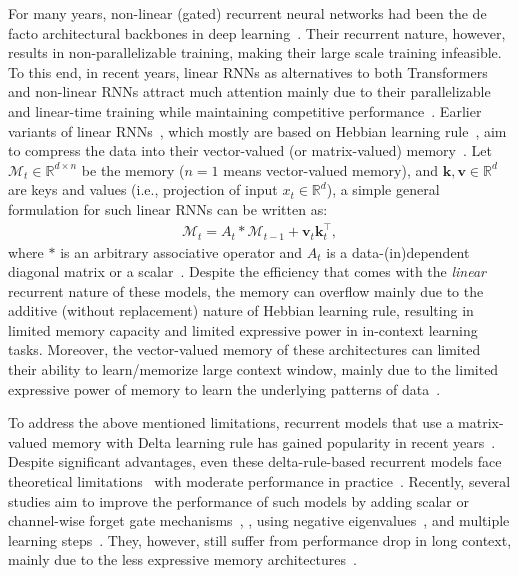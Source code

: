 \documentclass{article}
\newcommand{\citep}{\parencite}
\newcommand{\vk}[0]{\mathbf{k}}
\newcommand{\vvv}[0]{\mathbf{v}}
\newcommand{\M}[0]{\mathcal{M}}
\theoremstyle{plain}
\theoremstyle{definition}
\theoremstyle{remark}
\newcommand{\head}[1]{\vspace{1.7mm}\noindent{{\textcolor{c2}{\bf #1.}}}}
\begin{document}
\head{(Linear) Recurrent Models}
For many years, non-linear (gated) recurrent neural networks had been the de facto architectural backbones in deep learning~\citep{greff2016lstm}. Their recurrent nature, however, results in non-parallelizable training, making their large scale training infeasible. To this end, in recent years, linear RNNs as alternatives to both Transformers and non-linear RNNs attract much attention mainly due to their parallelizable and linear-time training while maintaining competitive performance~\citep{yang2024parallelizing, sun2023retentive, rwkv-repo}. Earlier variants of linear RNNs~\citep{yang2024gatedattn, sun2023retentive, de2024griffin}, which mostly are based on Hebbian learning rule~\citep{hebb2005organization}, aim to compress the data into their vector-valued (or matrix-valued) memory~\citep{katharopoulos2020transformers, sun2023retentive, yang2024gatedattn, de2024griffin, liu2024longhorn}. Let $\M_t \in \mathbb{R}^{d \times n}$ be the memory ($n=1$ means vector-valued memory), and $\vk, \vvv \in \mathbb{R}^{d}$ are keys and values (i.e., projection of input $x_t \in \mathbb{R}^{d}$), a simple general formulation for such linear RNNs can be written as:
\begin{align}
    \M_t = A_{t} \ast \M_{t-1} + \vvv_t \vk_t^{\top}, 
\end{align}
where $\ast$ is an arbitrary associative operator and $A_t$ is a data-(in)dependent diagonal matrix or a scalar~\citep{yang2024parallelizing}. Despite the efficiency that comes with the \emph{linear} recurrent nature of these models, the memory can overflow mainly due to the additive (without replacement) nature of Hebbian learning rule, resulting in limited memory capacity and limited expressive power in in-context learning tasks. Moreover, the vector-valued memory of these architectures can limited their ability to learn/memorize large context window, mainly due to the limited expressive power of memory to learn the underlying patterns of data~\citep{behrouz2024titans, sun2024learning}.
 
To address the above mentioned limitations, recurrent models that use a matrix-valued memory with Delta learning rule has gained popularity in recent years~\citep{neil2017delta,schlag2021linear, yang2024parallelizing}. Despite significant advantages, even these delta-rule-based recurrent models face theoretical limitations~\citep{irie2023practical} with moderate performance in practice~\citep{yang2024parallelizing}. Recently, several studies aim to improve the performance of such models by adding scalar or channel-wise forget gate mechanisms~\citep{yang2024gated, peng2025rwkv7}, , using negative eigenvalues~\citep{grazzi2024unlocking}, and multiple learning steps~\citep{siems2025deltaproduct}. They, however, still suffer from performance drop in long context, mainly due to the less expressive memory architectures~\citep{behrouz2024titans}. 
\end{document}
